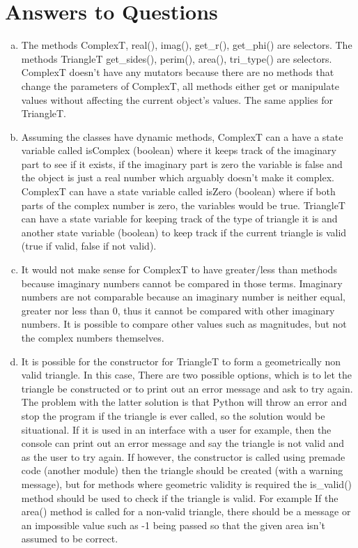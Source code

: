\documentclass[12pt]{article}
\begin{document}
\section{Answers to Questions}

\begin{enumerate}[(a)]

\item The methods ComplexT, real(), imag(), get\_r(), get\_phi() are selectors. The methods TriangleT get\_sides(), perim(), area(), tri\_type() are selectors. ComplexT doesn't have any mutators because there are no methods that change the parameters of ComplexT, all methods either get or manipulate values without affecting the current object's values. The same applies for TriangleT.
\item Assuming the classes have dynamic methods, ComplexT can a have a state variable called isComplex (boolean) where it keeps track of the imaginary part to see if it exists, if the imaginary part is zero the variable is false and the object is just a real number which arguably doesn't make it complex. ComplexT can have a state variable called isZero (boolean) where if both parts of the complex number is zero, the variables would be true. TriangleT can have a state variable for keeping track of the type of triangle it is and another state variable (boolean) to keep track if the current triangle is valid (true if valid, false if not valid).
\item It would not make sense for ComplexT to have greater/less than methods because imaginary numbers cannot be compared in those terms. Imaginary numbers are not comparable because an imaginary number is neither equal, greater nor less than 0, thus it cannot be compared with other imaginary numbers. It is possible to compare other values such as magnitudes, but not the complex numbers themselves.
\item It is possible for the constructor for TriangleT to form a geometrically non valid triangle. In this case, There are two possible options, which is to let the triangle be constructed or to print out an error message and ask to try again. The problem with the latter solution is that Python will throw an error and stop the program if the triangle is ever called, so the solution would be situational. If it is used in an interface with a user for example, then the console can print out an error message and say the triangle is not valid and as the user to try again. If however, the constructor is called using premade code (another module) then the triangle should be created (with a warning message), but for methods where geometric validity is required the is\_valid() method should be used to check if the triangle is valid. For example If the area() method is called for a non-valid triangle, there should be a message or an impossible value such as -1 being passed so that the given area isn’t assumed to be correct.

\end{enumerate}
\end{document}
